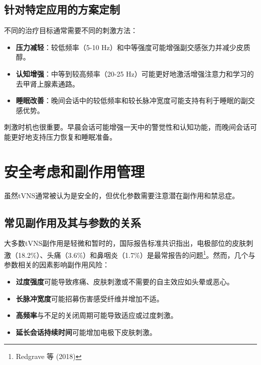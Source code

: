 \documentclass[
  Letterpaper,
]{scrbook}
\providecommand{\tightlist}{%
  \setlength{\itemsep}{0pt}\setlength{\parskip}{0pt}}\usepackage{longtable,booktabs,array}
\begin{document}
\subsection{针对特定应用的方案定制}\label{ux9488ux5bf9ux7279ux5b9aux5e94ux7528ux7684ux65b9ux6848ux5b9aux5236}

不同的治疗目标通常需要不同的刺激方法：

\begin{itemize}
\tightlist
\item
  \textbf{压力减轻}：较低频率（5-10
  Hz）和中等强度可能增强副交感张力并减少皮质醇。
\item
  \textbf{认知增强}：中等到较高频率（20-25
  Hz）可能更好地激活增强注意力和学习的去甲肾上腺素通路。
\item
  \textbf{睡眠改善}：晚间会话中的较低频率和较长脉冲宽度可能支持有利于睡眠的副交感优势。
\end{itemize}

刺激时机也很重要。早晨会话可能增强一天中的警觉性和认知功能，而晚间会话可能更好地支持压力恢复和睡眠准备。

\section{安全考虑和副作用管理}\label{ux5b89ux5168ux8003ux8651ux548cux526fux4f5cux7528ux7ba1ux7406}

虽然tVNS通常被认为是安全的，但优化参数需要注意潜在副作用和禁忌症。

\subsection{常见副作用及其与参数的关系}\label{ux5e38ux89c1ux526fux4f5cux7528ux53caux5176ux4e0eux53c2ux6570ux7684ux5173ux7cfb}

大多数tVNS副作用是轻微和暂时的，国际报告标准共识指出，电极部位的皮肤刺激（18.2\%）、头痛（3.6\%）和鼻咽炎（1.7\%）是最常报告的问题\footnote{Redgrave
  等 (2018)}。然而，几个与参数相关的因素影响副作用风险：

\begin{itemize}
\tightlist
\item
  \textbf{过度强度}可能导致疼痛、皮肤刺激或不需要的自主效应如头晕或恶心。
\item
  \textbf{长脉冲宽度}可能招募伤害感受纤维并增加不适。
\item
  \textbf{高频率}与不足的关闭周期可能导致适应或过度刺激。
\item
  \textbf{延长会话持续时间}可能增加电极下皮肤刺激。
\end{itemize}
\end{document}
